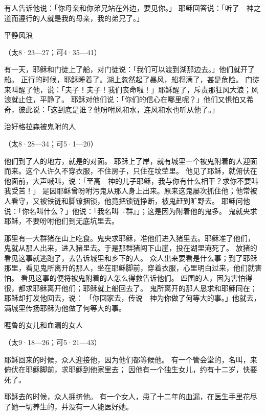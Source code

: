 {有人告诉他说：「你母亲和你弟兄站在外边，要见你。」
耶稣回答说：「听了　神之道而遵行的人就是我的母亲，我的弟兄了。」
\par }{\SH 平静风浪
\par }{\R （太8·23—27；可4·35—41）
\par }{\PP {}有一天，耶稣和门徒上了船，对门徒说：「我们可以渡到湖那边去。」他们就开了船。
正行的时候，耶稣睡着了。湖上忽然起了暴风，船将满了{}，甚是危险。
门徒来叫醒了他，说：「夫子！夫子！我们丧命啦！」耶稣醒了，斥责那狂风大浪；风浪就止住，平静了。
耶稣对他们说：「你们的信心在哪里呢？」他们又惧怕又希奇，彼此说：「这到底是谁？他吩咐风和水，连风和水也听从他了。」
\par }{\SH 治好格拉森被鬼附的人
\par }{\R （太8·28—34；可5·1—20）
\par }{\PP {}他们到了{}人的地方，就是{}的对面。
耶稣上了岸，就有城里一个被鬼附着的人迎面而来。这个人许久不穿衣服，不住房子，只住在坟茔里。
他见了耶稣，就俯伏在他面前，大声喊叫，说：「至高　神的儿子耶稣，我与你有什么相干？求你不要叫我受苦！」
是因耶稣曾吩咐污鬼从那人身上出来。原来这鬼屡次抓住他；他常被人看守，又被铁链和脚镣捆锁，他竟把锁链挣断，被鬼赶到旷野去。
耶稣问他说：「你名叫什么？」他说：「我名叫『群』」；这是因为附着他的鬼多。
鬼就央求耶稣，不要吩咐他们到无底坑里去。
\par }{\PP {}那里有一大群猪在山上吃食。鬼央求耶稣，准他们进入猪里去。耶稣准了他们，
鬼就从那人出来，进入猪里去。于是那群猪闯下山崖，投在湖里淹死了。
放猪的看见这事就逃跑了，去告诉城里和乡下的人。
众人出来要看是什么事；到了耶稣那里，看见鬼所离开的那人，坐在耶稣脚前，穿着衣服，心里明白过来，他们就害怕。
看见这事的便将被鬼附着的人怎么得救告诉他们。
四围的人，因为害怕得很，都求耶稣离开他们；耶稣就上船回去了。
鬼所离开的那人恳求和耶稣同在；耶稣却打发他回去，说：
「你回家去，传说　神为你做了何等大的事。」他就去，满城里传扬耶稣为他做了何等大的事。
\par }{\SH 睚鲁的女儿和血漏的女人
\par }{\R （太9·18—26；可5·21—43）
\par }{\PP {}耶稣回来的时候，众人迎接他，因为他们都等候他。
有一个管会堂的，名叫{}，来俯伏在耶稣脚前，求耶稣到他家里去；
因他有一个独生女儿，约有十二岁，快要死了。
\par }{\PP 耶稣去的时候，众人拥挤他。
有一个女人，患了十二年的血漏，在医生手里花尽了她一切养生的，并没有一人能医好她。
}
